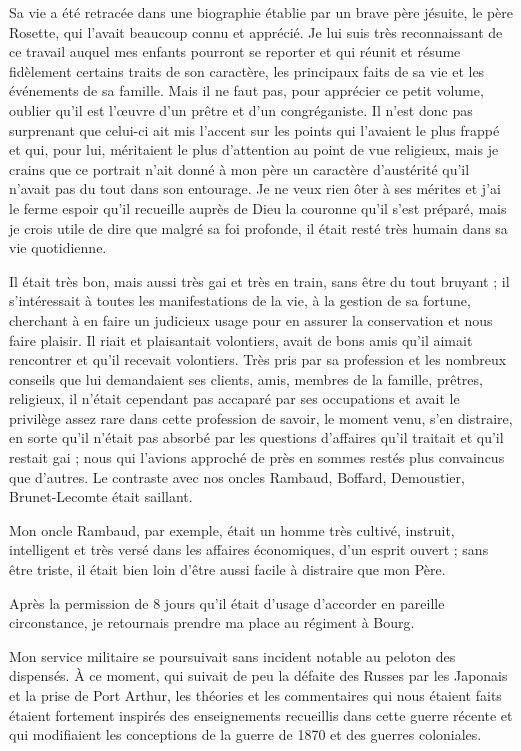 \documentclass[11pt,a4paper]{report}
\begin{document}
Sa vie a été retracée dans une biographie établie par un brave père jésuite, le père Rosette, qui l'avait beaucoup connu et apprécié. Je lui suis très reconnaissant de ce travail auquel mes enfants pourront se reporter et qui réunit et résume fidèlement certains traits de son caractère, les principaux faits de sa vie et les événements de sa famille. Mais il ne faut pas, pour apprécier ce petit volume, oublier qu'il est l'œuvre d'un prêtre et d'un congréganiste. Il n'est donc pas surprenant que celui-ci ait mis l'accent sur les points qui l'avaient le plus frappé et qui, pour lui, méritaient le plus d'attention au point de vue religieux, mais je crains que ce portrait n'ait donné à mon père un caractère d'austérité qu'il n'avait pas du tout dans son entourage. Je ne veux rien ôter à ses mérites et j'ai le ferme espoir qu'il recueille auprès de Dieu la couronne qu'il s'est préparé, mais je crois utile de dire que malgré sa foi profonde, il était resté très humain dans sa vie quotidienne.

Il était très bon, mais aussi très gai et très en train, sans être du tout bruyant ; il s'intéressait à toutes les manifestations de la vie, à la gestion de sa fortune, cherchant à en faire un judicieux usage pour en assurer la conservation et nous faire plaisir. Il riait et plaisantait volontiers, avait de bons amis qu'il aimait rencontrer et qu'il recevait volontiers. Très pris par sa profession et les nombreux conseils que lui demandaient ses clients, amis, membres de la famille, prêtres, religieux, il n'était cependant pas accaparé par ses occupations et avait le privilège assez rare dans cette profession de savoir, le moment venu, s'en distraire, en sorte qu'il n'était pas absorbé par les questions d'affaires qu'il traitait et qu'il restait gai ; nous qui l'avions approché de près en sommes restés plus convaincus que d'autres. Le contraste avec nos oncles Rambaud, Boffard, Demoustier, Brunet-Lecomte était saillant.

Mon oncle Rambaud, par exemple, était un homme très cultivé, instruit, intelligent et très versé dans les affaires économiques, d'un esprit ouvert ; sans être triste, il était bien loin d'être aussi facile à distraire que mon Père.

Après la permission de 8 jours qu'il était d'usage d'accorder en pareille circonstance, je retournais prendre ma place au régiment à Bourg.

Mon service militaire se poursuivait sans incident notable au peloton des dispensés. À ce moment, qui suivait de peu la défaite des Russes par les Japonais et la prise de Port Arthur, les théories et les commentaires qui nous étaient faits étaient fortement inspirés des enseignements recueillis dans cette guerre récente et qui modifiaient les conceptions de la guerre de 1870 et des guerres coloniales.
\end{document}
